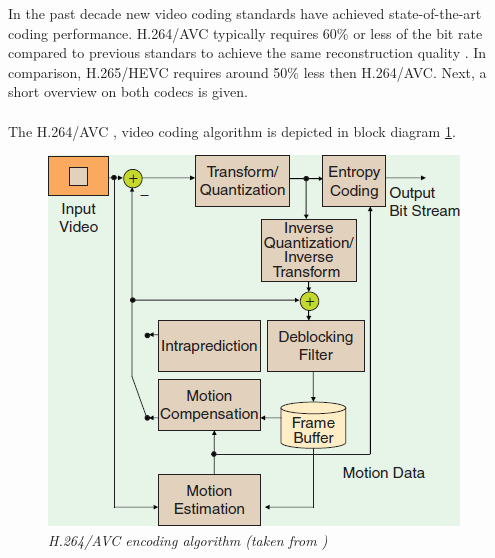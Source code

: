In the past decade new video coding standards have achieved state-of-the-art coding performance. H.264/AVC typically requires 60\% or less of the bit rate compared to previous standars to achieve the same reconstruction quality \cite{H264_Overview}. In comparison, H.265/HEVC requires around 50\% less then H.264/AVC. Next, a short overview on both codecs is given.\\
\\
The H.264/AVC \cite{h264joint}, \cite{H264_Overview} video coding algorithm is depicted in block diagram \ref{h264}.

\begin{figure}[H]
\centerline{\includegraphics[scale=0.5]{pics/H264_Blockschaltbild}} %
\caption{\label{h264}{\it H.264/AVC encoding algorithm (taken from \cite{Paper1})}}
\end{figure} %

